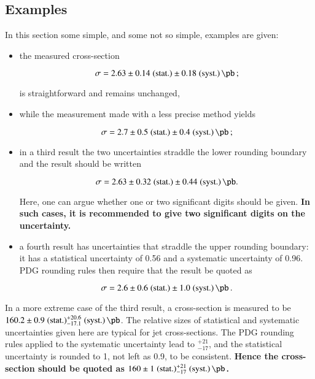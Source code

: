 \documentclass[UKenglish]{style/atlasdoc}
\begin{document}
\subsection{Examples}
\label{sec:recc:example}

In this section some simple, and some not so simple, examples are given:
\begin{itemize}
\item the measured cross-section
  \begin{linenomath}
    \begin{equation*}
      \sigma = 2.63 \pm 0.14\stat \pm 0.18\syst\,\si{\pb}\,;
    \end{equation*}
  \end{linenomath}
  is straightforward and remains unchanged,
\item while the measurement made with a less precise method yields
  \begin{linenomath}
    \begin{equation*}
      \sigma = 2.7 \pm 0.5\stat \pm 0.4\syst\,\si{\pb}\,;
    \end{equation*}
  \end{linenomath}
\item in a third result the two uncertainties straddle the lower rounding boundary
and the result should be written
  \begin{linenomath}
    \begin{equation*}
      \sigma = 2.63 \pm 0.32\stat \pm 0.44\syst\,\si{\pb}.
    \end{equation*}
  \end{linenomath}
Here, one can argue whether one or two
significant digits should be given. \textbf{In such cases, it is recommended
to give two significant digits on the uncertainty.}
\item a fourth result has uncertainties that straddle the upper rounding boundary: it has a statistical
  uncertainty of \num{0.56} and a systematic uncertainty of \num{0.96}. PDG
  rounding rules then require that the result be quoted as
  \begin{linenomath}
    \begin{equation*}
      \sigma = 2.6 \pm 0.6\stat \pm 1.0\syst\,\si{\pb}\,.
    \end{equation*}
  \end{linenomath}
\end{itemize}
In a more extreme case of the third result, a cross-section is
measured to be\\
$160.2 \pm 0.9\stat ^{+20.6}_{-17.1}\syst\,\si{\pb}$.
The relative sizes of statistical and systematic uncertainties given
here are typical for jet cross-sections.
The PDG rounding rules applied to the systematic uncertainty lead to $^{+21}_{-17}$,
and the statistical uncertainty is rounded to 1, not left as 0.9, to be consistent.
\textbf{\boldmath Hence the cross-section should be quoted as 
$160 \pm 1\stat ^{+21}_{-17}\syst\,\si{\pb}$.}
\end{document}

